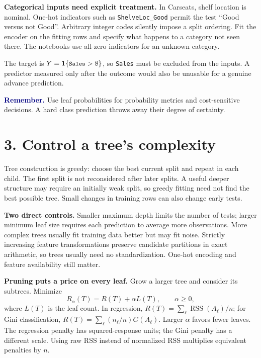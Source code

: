 \documentclass[11pt,a4paper]{article}
\newcommand{\code}[1]{\texttt{\small #1}}
\newcommand{\idea}[1]{\textcolor{navy}{\textbf{Remember.}} #1}
\begin{document}
\textbf{Categorical inputs need explicit treatment.}
In Carseats, shelf location is nominal. One-hot indicators such as
\code{ShelveLoc\_Good} permit the test ``Good versus not Good''.
Arbitrary integer codes silently impose a split ordering. Fit the encoder on
the fitting rows and specify what happens to a category not seen there.
The notebooks use all-zero indicators for an unknown category.

The target is $Y=\mathbf1\{\code{Sales}>8\}$, so \code{Sales} must be
excluded from the inputs. A predictor measured only after the outcome would also
be unusable for a genuine advance prediction.

\idea{Use leaf probabilities for probability metrics and cost-sensitive decisions.
A hard class prediction throws away their degree of certainty.}

\newpage
\section*{3. Control a tree's complexity}
Tree construction is greedy: choose the best current split and repeat in each
child. The first split is not reconsidered after later splits. A useful deeper
structure may require an initially weak split, so greedy fitting need not find
the best possible tree. Small changes in training rows can also change early tests.

\textbf{Two direct controls.} Smaller maximum depth limits the number of tests;
larger minimum leaf size requires each prediction to average more observations.
More complex trees usually fit training data better but may fit noise.
Strictly increasing feature transformations preserve candidate partitions in
exact arithmetic, so trees usually need no standardization. One-hot encoding
and feature availability still matter.

\textbf{Pruning puts a price on every leaf.}
Grow a larger tree and consider its subtrees. Minimize
\[
\boxed{R_\alpha(T)=R(T)+\alpha L(T),\qquad \alpha\ge0,}
\]
where $L(T)$ is the leaf count. In regression,
$R(T)=\sum_{\ell}\operatorname{RSS}(A_\ell)/n$; for Gini classification,
$R(T)=\sum_\ell(n_\ell/n)G(A_\ell)$. Larger $\alpha$ favors fewer leaves.
The regression penalty has squared-response units; the Gini penalty has a
different scale. Using raw RSS instead of normalized RSS multiplies equivalent
penalties by $n$.
\end{document}
